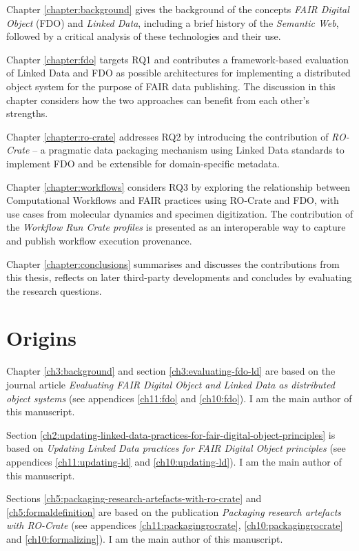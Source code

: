 Chapter \vref{chapter:background} gives the background of the concepts \emph{FAIR Digital Object} (FDO) and \emph{Linked Data}, including a brief history of the \emph{Semantic Web}, followed by a critical analysis of these technologies and their use. 

Chapter \vref{chapter:fdo} targets RQ1 and contributes a framework-based evaluation of Linked Data and FDO as possible architectures for implementing a distributed object system for the purpose of FAIR data publishing. The discussion in this chapter considers how the two approaches can benefit from each other's strengths. 

Chapter \vref{chapter:ro-crate} addresses RQ2 by introducing the contribution of \emph{RO-Crate} -- a pragmatic data packaging mechanism using Linked Data standards to implement FDO and be extensible for domain-specific metadata.  

Chapter \vref{chapter:workflows} considers RQ3 by exploring the relationship between Computational Workflows and FAIR practices using RO-Crate and FDO, with use cases from molecular dynamics and specimen digitization. The contribution of the \emph{Workflow Run Crate profiles} is presented as an interoperable way to capture and publish workflow execution provenance. 

Chapter \vref{chapter:conclusions} summarises and discusses the contributions from this thesis, reflects on later third-party developments and concludes by evaluating the research questions.


\section{Origins}
\label{intro:origins}

Chapter \ref{ch3:background} and section \ref{ch3:evaluating-fdo-ld} are based on the journal article \emph{Evaluating FAIR Digital Object and Linked Data as distributed object systems} \cite{Soiland-Reyes 2023c}  (see appendices \ref{ch11:fdo} and \ref{ch10:fdo}). I am the main author of this manuscript.

Section \ref{ch2:updating-linked-data-practices-for-fair-digital-object-principles} is based on \emph{Updating Linked Data practices for FAIR Digital Object principles} \cite{Soiland-Reyes 2022d} (see appendices \ref{ch11:updating-ld} and \ref{ch10:updating-ld}). I am the main author of this manuscript.

Sections \ref{ch5:packaging-research-artefacts-with-ro-crate} and \ref{ch5:formaldefinition} are based on the publication \emph{Packaging research artefacts with RO-Crate} \cite{Soiland-Reyes 2022a} (see appendices \ref{ch11:packagingrocrate}, \ref{ch10:packagingrocrate} and \ref{ch10:formalizing}). I am the main author of this manuscript.

